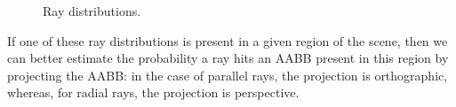 \documentclass[11pt,a4paper,twocolumn]{article}
\begin{document}
\begin{figure}[H]
{	}
	\qquad
    \caption{Ray distributions.}
    \label{fig:ray_distributions}
\end{figure} 

If one of these ray distributions is present in a given region of the scene, then we can better estimate the probability a ray hits an AABB present in this region by projecting the AABB: in the case of parallel rays, the projection is orthographic, whereas, for radial rays, the projection is perspective.
\end{document}
